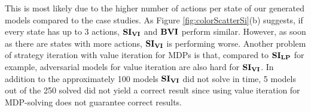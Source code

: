 \FloatBarrier
This is most likely due to the higher number of actions per state of our generated models compared to the case studies.
As Figure \ref{fig:colorScatterSi}(b) suggests, if every state has up to 3 actions, $\mathbf{SI_{VI}}$ and $\mathbf{BVI}$ perform similar.
However, as soon as there are states with more actions, $\mathbf{SI_{VI}}$ is performing worse.
Another problem of strategy iteration with value iteration for MDPs is that, compared to $\mathbf{SI_{LP}}$ for example, 
adversarial models for value iteration are also hard for $\mathbf{SI_{VI}}$.
In addition to the approximately 100 models $\mathbf{SI_{VI}}$ did not solve in time, 
5 models out of the 250 solved did not yield a correct result since using value iteration for MDP-solving does not guarantee correct results.